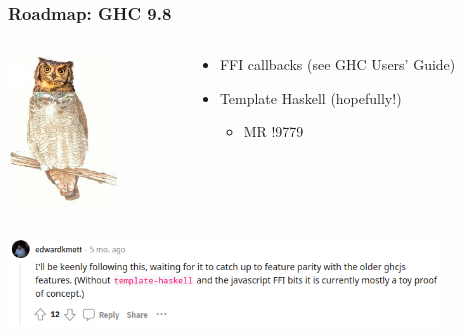 \documentclass[aspectratio=169]{beamer}
\begin{document}
\begin{frame}
\frametitle{Roadmap: GHC 9.8}
\begin{columns}

\begin{column}{0.3\textwidth}
\begin{center}
\includegraphics[height=4cm]{images/owl3.png}
\end{center}
\end{column}

\begin{column}{0.6\textwidth}
\begin{itemize}
\item FFI callbacks (see GHC Users' Guide)
\item Template Haskell (hopefully!)
\begin{itemize}
\item MR !9779
\end{itemize}
\end{itemize}
\end{column}

\end{columns}
\begin{center}
\includegraphics[height=2.3cm]{images/kmett.png}
\end{center}
\end{frame}
\end{document}
